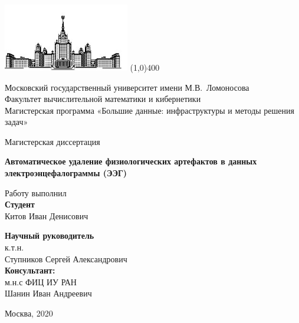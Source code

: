 \documentclass[12pt, a4paper, titlepage]{extreport}
\begin{document}
 
	\begin{titlepage} 
		\begin{center} 
			
			\includegraphics[width=55mm]{msu} 
			\line(1,0){400}
			
			Московский государственный университет имени М.В.~Ломоносова\\ 
			Факультет вычислительной математики и кибернетики\\ 
			Магистерская программа «Большие данные: инфраструктуры и методы решения задач»
			
			\vspace{3.5cm} 
			
			{\Large Магистерская диссертация}
			
			\vspace{1cm} 
						
			{\Large{\textbf{Автоматическое удаление физиологических артефактов в данных электроэнцефалограммы (ЭЭГ)\\}}}
			
			\vspace{0.7cm} 
			
			
		\end{center} 
		
		\vfill 

		\begin{flushright} 
			Работу выполнил\\
			\textbf{Студент}\\ 
			Китов Иван Денисович
		\end{flushright}

				
		\begin{flushright} 
			\textbf{Научный руководитель}\\ 
			к.т.н. \\ Ступников Сергей Александрович\\
			\textbf{Консультант:}\\
			м.н.с ФИЦ ИУ РАН\\ Шанин Иван Андреевич 
		\end{flushright} 
		
		\vfill 
		
		\begin{center} 
			Москва, 2020 
		\end{center} 
		
		\enlargethispage{4\baselineskip} 
		
	\end{titlepage}
\end{document}
